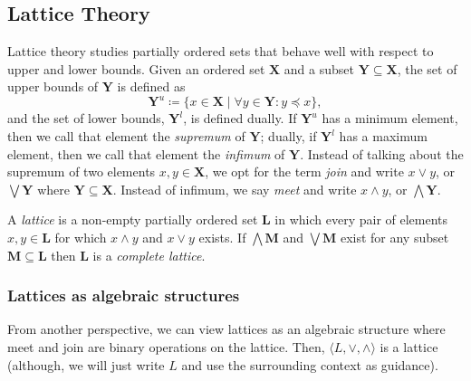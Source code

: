 \subsection{Lattice Theory}
\label{subsection:lattice-theory}
Lattice theory studies partially ordered sets that behave well with respect to upper and lower bounds. Given an ordered set $\mathbf{X}$ and a subset $\mathbf{Y} \subseteq \mathbf{X}$, the set of upper bounds of $\mathbf{Y}$ is defined as
\[
\mathbf{Y}^u \coloneqq \{x \in \mathbf{X} \mid \forall y \in \mathbf{Y} : y \preceq x\},
\]
and the set of lower bounds, $\mathbf{Y}^l$, is defined dually. If $\mathbf{Y}^u$ has a minimum element, then we call that element the \textit{supremum} of $\mathbf{Y}$; dually, if $\mathbf{Y}^l$ has a maximum element, then we call that element the \textit{infimum} of $\mathbf{Y}$. Instead of talking about the supremum of two elements $x,y \in \mathbf{X}$, we opt for the term \textit{join} and write $x \vee y$, or $\bigvee \mathbf{Y}$ where $\mathbf{Y} \subseteq \mathbf{X}$. Instead of infimum, we say \textit{meet} and write $x \wedge y$, or $\bigwedge \mathbf{Y}$.    

A \textit{lattice} is a non-empty partially ordered set $\mathbf{L}$ in which every pair of elements $x,y \in \mathbf{L}$ for which $x \wedge y$ and $x \vee y$ exists. If $\bigwedge \mathbf{M}$ and $\bigvee \mathbf{M}$ exist for any subset $\mathbf{M} \subseteq \mathbf{L}$ then $\mathbf{L}$ is a \textit{complete lattice}.  


\subsubsection{Lattices as algebraic structures}
\label{subsubsection:lattices-as-algebraic-structures}

From another perspective, we can view lattices as an algebraic structure where meet and join are binary operations on the lattice. Then, $\langle L, \vee, \wedge \rangle$ is a lattice (although, we will just write $L$ and use the surrounding context as guidance). 

